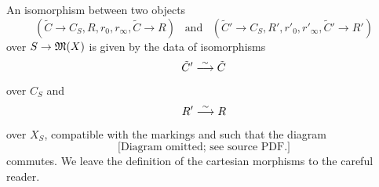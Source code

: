 An isomorphism between two objects
\begin{equation*}
(\tilde C \to C_S, R, r_0, r_\infty, \tilde C \to R) \,\,\, \text{ and } \,\,\, (\tilde C' \to C_S, R', r'_0, r'_\infty, \tilde C' \to R')
\end{equation*}
over $S \to \frak M(X)$ is given by the data of isomorphisms
\begin{equation*}
\tilde C' \isom \tilde C%
\end{equation*}
over $C_S$ and
\begin{equation*}
R' \stackrel{\sim}{\longrightarrow} R
\end{equation*}
over $X_S$, compatible with the markings and such that the diagram
\begin{equation*}
\text{[Diagram omitted; see source PDF.]}
\end{equation*}
commutes. We leave the definition of the cartesian morphisms to the careful reader.




